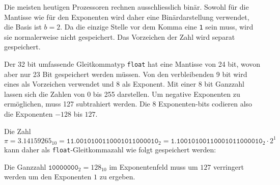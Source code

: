 Die meisten heutigen Prozessoren rechnen ausschliesslich binär.
Sowohl für die Mantisse wie für den Exponenten wird daher eine
Binärdarstellung verwendet, die Basis ist $b=2$.
Da die einzige Stelle vor dem Komma eine \texttt{1} sein muss, wird
sie normalerweise nicht gespeichert.
Das Vorzeichen der Zahl wird separat gespeichert.

Der 32 bit umfassende Gleitkommatyp \texttt{float} hat eine Mantisse
von 24 bit, wovon aber nur 23 Bit gespeichert werden müssen.
Von den verbleibenden 9 bit wird eines als Vorzeichen verwendet und
8 als Exponent.
Mit einer 8 bit Ganzzahl lassen sich die Zahlen von 0 bis 255 darstellen.
Um negative Exponenten zu ermöglichen, muss 127 subtrahiert werden.
Die 8 Exponenten-bits codieren also die Exponenten $-128$ bis $127$.

Die Zahl
\[
\pi 
=
3.14159265_{10}
=
\texttt{11.0010100110001011000010}_2
=
\texttt{1.10010100110001011000010}_2\cdot 2^{1}
\]
kann daher als \texttt{float}-Gleitkommazahl wie folgt gespeichert werden:
\begin{center}
\end{center}
Die Ganzzahl $\texttt{10000000}_2=128_{10}$ im Exponentenfeld
muss um $127$ verringert werden um den Exponenten $1$ zu ergeben.

